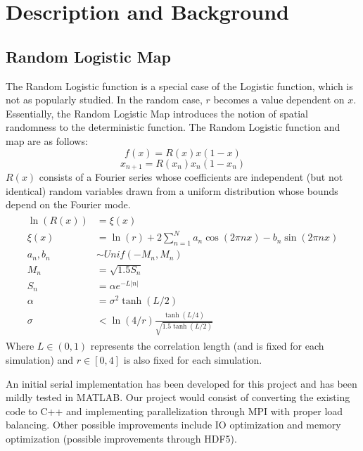 \documentclass[12pt]{article}
\begin{document}
\section{Description and Background}

\subsection{Random Logistic Map}
The Random Logistic function is a special case of the Logistic
function, which is not as popularly studied. In the random case, $r$ becomes a value dependent on $x$. Essentially, the Random Logistic
Map introduces the notion of spatial randomness to the deterministic
function. The Random Logistic function and map are as follows:
\begin{equation*}
f(x) = R(x)x(1-x)
\end{equation*}
\begin{equation}\label{randmap}
x_{n+1} = R(x_n)x_n(1-x_n)
\end{equation}
$R(x)$ consists of a Fourier series whose coefficients are independent
(but not identical) random variables drawn from a uniform
distribution whose bounds depend on the Fourier mode. 
\begin{align*}
\begin{split}
\ln(R(x)) &= \xi(x)\\
\xi(x) &= \ln(r) + 2\sum^N_{n=1}a_n\cos(2\pi nx)-b_n\sin(2\pi nx)\\
a_n,b_n &\sim Unif(-M_n,M_n)\\
M_n &= \sqrt{1.5S_n}\\
S_n &= \alpha e^{-L|n|}\\
\alpha &= \sigma^2 \tanh(L/2)\\
\sigma &< \ln(4/r)\frac{\tanh(L/4)}{\sqrt{1.5\tanh(L/2)}}
\end{split}
\end{align*}
Where $L \in (0,1)$ represents the correlation length (and is fixed
for each simulation) and $r \in [0,4]$ is also fixed for each simulation.

An initial serial implementation has been developed for this project
and has been mildly tested in
MATLAB. Our project would consist of converting the existing code to
C++ and implementing parallelization through MPI with proper load balancing. Other possible improvements include
IO optimization and memory optimization (possible improvements through
HDF5). 
\end{document}
